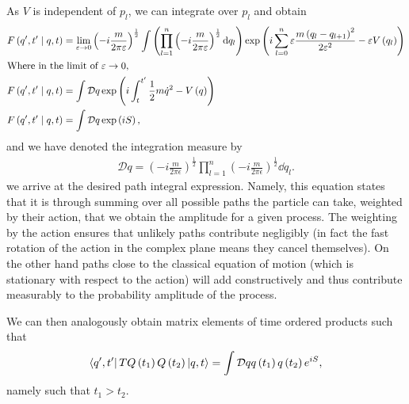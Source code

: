 As $V$ is independent of $p_l$, we can integrate over $p_l$ and obtain
\begin{align*}
    F\left( q', t'  \mid q,t \right) &= \lim_{\epsilon \to 0} \left( -i\frac{m}{2 \pi \epsilon} \right)^{\frac{1}{2}} \int \left( \prod_{l = 1}^{n} \left( -i\frac{m}{2\pi \epsilon} \right)^{\frac{1}{2}} \dd{q_l}  \right)  \exp \left( i \sum_{l=0}^{n} \epsilon\frac{m \left( q_l - q_{l+1} \right)^2}{2 \epsilon^2} - \epsilon V \left( q_l \right)  \right)  \\
    \intertext{Where in the limit of $\epsilon \to 0$,}
    F\left( q', t'  \mid q,t \right) &= \int \mathcal{D}q  \exp \left( i \int_t^{t'} \frac{1}{2}m \dot{q}^2 - V\left( q \right) \right) \\
    F\left( q', t'  \mid q,t \right) &= \int \mathcal{D}q  \exp \left( i S \right)
,\end{align*}
and we have denoted the integration measure by
\begin{align*}
    \mathcal{D}q = \left( -i\frac{m}{2\pi \epsilon} \right)^{\frac{1}{2}} \prod_{l = 1}^{n} \left( -i\frac{m}{2\pi \epsilon} \right)^{\frac{1}{2}} \dd{q_l}
.\end{align*}
we arrive at the desired path integral expression. Namely, this equation states that it is through summing over all possible paths the particle can take, weighted by their action, that we obtain the amplitude for a given process. The weighting by the action ensures that unlikely paths contribute negligibly (in fact the fast rotation of the action in the complex plane means they cancel themselves). On the other hand paths close to the classical equation of motion (which is stationary with respect to the action) will add constructively and thus contribute measurably to the probability amplitude of the process.

\begin{note}
    We can then analogously obtain matrix elements of time ordered products such that
    \begin{align*}
        \bra{q', t'} T Q\left( t_1 \right) Q \left( t_2 \right) \ket{q,t} = \int \mathcal{D}q q\left( t_1 \right) q\left( t_2 \right) e^{iS}
    ,\end{align*}
    namely such that $t_1 > t_2$.
\end{note}

